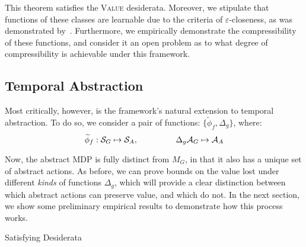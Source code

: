 This theorem satisfies the \textsc{Value} desiderata. Moreover, we stipulate that functions of these classes are learnable due to the criteria of $\varepsilon$-closeness, as was demonstrated by~\cite{ortner2007logarithmic}. Furthermore, we empirically demonstrate the compressibility of these functions, and consider it an open problem as to what degree of compressibility is achievable under this framework.

\subsection{Temporal Abstraction}
Most critically, however, is the framework's natural extension to temporal abstraction. To do so, we consider a pair of functions: $\{\widetilde{\phi}_f, \Delta_g\}$, where:
\begin{equation}
\widetilde{\phi}_f: \mathcal{S}_G \mapsto \mathcal{S}_A, \hspace{16mm} \Delta_g \mathcal{A}_G \mapsto \mathcal{A}_A
\end{equation}

Now, the abstract MDP is fully distinct from $M_G$, in that it also has a unique set of abstract actions. As before, we can prove bounds on the value lost under different {\it kinds} of functions $\Delta_g$, which will provide a clear distinction between which abstract actions can preserve value, and which do not. In the next section, we show some preliminary empirical results to demonstrate how this process works.

Satisfying Desiderata

